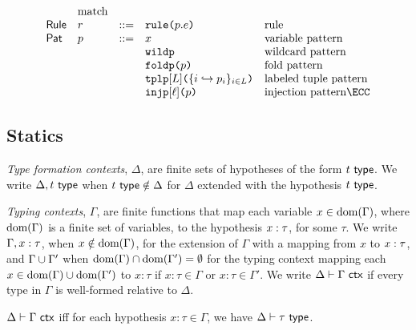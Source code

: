 \[\begin{array}{lllllll}
& \text{match}\\
\mathsf{Rule} & r & ::= 
& \aematchrule{p}{e} 
& \text{rule}\\
\mathsf{Pat} & p & ::= 
& x  
& \text{variable pattern}\\
&&& \aewildp 
& \text{wildcard pattern}\\
&&& \aefoldp{p} 
& \text{fold pattern}\\
&&& \aetplp{\labelset}{\mapschema{p}{i}{\labelset}} 
& \text{labeled tuple pattern}\\
&&& \aeinjp{\ell}{p} 
& \text{injection pattern} \ECC
\end{array}\]

\subsection{Statics}
\emph{Type formation contexts}, $\Delta$, are finite sets of hypotheses of the form $t~\mathsf{type}$. We write $\Delta, t~\mathsf{type}$ when $t~\mathsf{type} \notin \Delta$ for $\Delta$ extended with the hypothesis $t~\mathsf{type}$. %

\emph{Typing contexts}, $\Gamma$, are finite functions that map each variable $x \in \text{dom}(\Gamma)$, where $\text{dom}(\Gamma)$ is a finite set of variables, to the hypothesis $x : \tau$, for some $\tau$. We write $\Gamma, x : \tau$, when $x \notin \text{dom}(\Gamma)$, for the extension of $\Gamma$ with a mapping from $x$ to $x : \tau$, and ${\Gamma}\cup{\Gamma'}$ when $\text{dom}(\Gamma) \cap \text{dom}(\Gamma') = \emptyset$ for the typing context mapping each $x \in \text{dom}(\Gamma) \cup \text{dom}(\Gamma')$ to $x : \tau$ if $x : \tau \in \Gamma$ or $x : \tau \in \Gamma'$. We write $\Delta \vdash \Gamma~\mathsf{ctx}$ if every type in $\Gamma$ is well-formed relative to $\Delta$.
\begin{definition} \label{def:isctxU}
$\Delta \vdash \Gamma~\mathsf{ctx}$ iff for each hypothesis $x : \tau \in \Gamma$, we have $\Delta \vdash \tau~\mathsf{type}$.
\end{definition}

